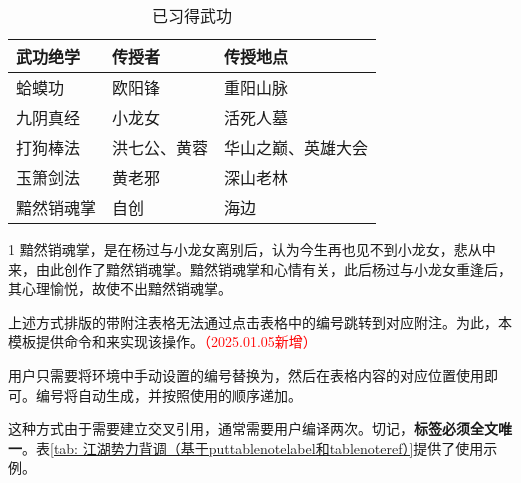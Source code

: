 \documentclass[print, doctor, vlined]{DissertUESTC}
\begin{document}
	\begin{table}[!ht]
		\caption{已习得武功} \label{tab: 已习得武功}
		\begin{threeparttable}
			\begin{tabular}{p{3cm} p{3cm} p{5cm}}
				\toprule
				\textbf{武功绝学} & \textbf{传授者} & \textbf{传授地点} \\
				\midrule
				蛤蟆功 & 欧阳锋 & 重阳山脉 \\
				九阴真经 & 小龙女 & 活死人墓 \\
				打狗棒法 & 洪七公、黄蓉 & 华山之巅、英雄大会 \\
				玉箫剑法 & 黄老邪 & 深山老林 \\
				黯然销魂掌\tnote{1} & 自创 & 海边 \\
				\bottomrule
			\end{tabular}
			\begin{tablenotes}[online]
				\item[1] 黯然销魂掌，是在杨过与小龙女离别后，认为今生再也见不到小龙女，悲从中来，由此创作了黯然销魂掌。黯然销魂掌和心情有关，此后杨过与小龙女重逢后，其心理愉悦，故使不出黯然销魂掌。
			\end{tablenotes}
		\end{threeparttable}
	\end{table}

	上述方式排版的带附注表格无法通过点击表格中的编号跳转到对应附注。为此，本模板提供命令和来实现该操作。\textcolor{red}{（2025.01.05新增）}

	用户只需要将环境中手动设置的编号替换为，然后在表格内容的对应位置使用即可。编号将自动生成，并按照使用的顺序递加。

	这种方式由于需要建立交叉引用，通常需要用户编译两次。切记，\textbf{标签必须全文唯一}。表\ref{tab: 江湖势力背调（基于puttablenotelabel和tablenoteref）}提供了使用示例。
\end{document}
